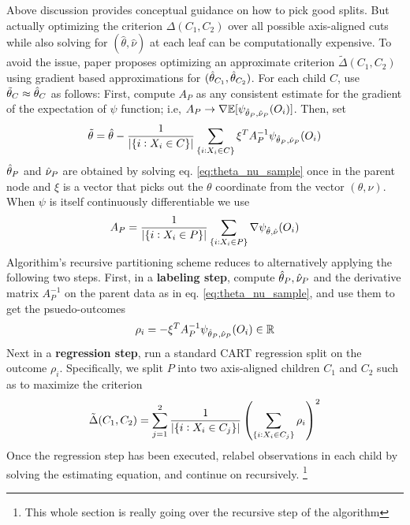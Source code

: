 Above discussion provides conceptual guidance on how to pick good splits. But actually optimizing the criterion $\Delta(C_1,C_2)$ over all possible axis-aligned cuts while also solving for $(\hat{\theta}, \hat{\nu})$ at each leaf can be computationally expensive. To avoid the issue, paper proposes optimizing an approximate criterion $\tilde{\Delta}(C_1,C_2)$ using gradient based approximations for $(\hat{\theta}_{C_1},\hat{\theta}_{C_2})$. For each child $C$, use $\tilde{\theta}_C \approx \hat{\theta}_C$ as follows: First, compute $A_P$ as any consistent estimate for the gradient of the expectation of $\psi$ function; i.e, $A_P \rightarrow \nabla\mathbb{E}[\psi_{\hat{\theta}_P,\hat{\nu}_P}(O_i)]$. Then, set 
\begin{equation}
	\label{eq:thetaT_def}
	\tilde{\theta} = \hat{\theta} - \frac{1}{|\{i: X_i \in C\}|} \sum_{\{i: X_i \in C\}} \xi^T A_P^{-1} \psi_{\hat{\theta}_P, \hat{\nu}_P}(O_i)
\end{equation}
$\hat{\theta}_P$ and $\hat{\nu}_P$ are obtained by solving eq. \ref{eq:theta_nu_sample} once in the parent node and $\xi$ is a vector that picks out the $\theta$ coordinate from the vector $(\theta, \nu)$. When $\psi$ is itself continuously differentiable we use 
\begin{equation}
	\label{eq:Ap_def}
	A_P = \frac{1}{|\{i: X_i \in P\}|} \sum_{\{i: X_i \in P\}} \nabla \psi_{\hat{\theta}, \hat{\nu}}(O_i)
\end{equation}
Algorithim's recursive partitioning scheme reduces to alternatively applying the following two steps. First, in a \textbf{labeling step}, compute $\hat{\theta}_P, \hat{\nu}_P$ and the derivative matrix $A_{P}^{-1}$ on the parent data as in eq. \ref{eq:theta_nu_sample}, and use them to get the psuedo-outcomes 
\begin{equation}
	\label{eq:labeling_step}
	\rho_i = -\xi^T A_P^{-1} \psi_{\hat{\theta}_P, \hat{\nu}_P}(O_i) \in \mathbb{R}
\end{equation}
Next in a \textbf{regression step}, run a standard CART regression split on the outcome $\rho_i$. Specifically, we split $P$ into two axis-aligned children $C_1$ and $C_2$ such as to maximize the criterion 
\begin{equation}
	\label{eq:regression_step_criterion}
	\tilde{\Delta}(C_1,C_2) = \sum_{j=1}^2 \frac{1}{|\{i: X_i \in C_j\}|}\left(\sum_{\{i:X_i \in C_j\}}  \rho_i\right)^2
\end{equation}
Once the regression step has been executed, relabel observations in each child by solving the estimating equation, and continue on recursively. \footnote{This whole section is really going over the recursive step of the algorithm}
